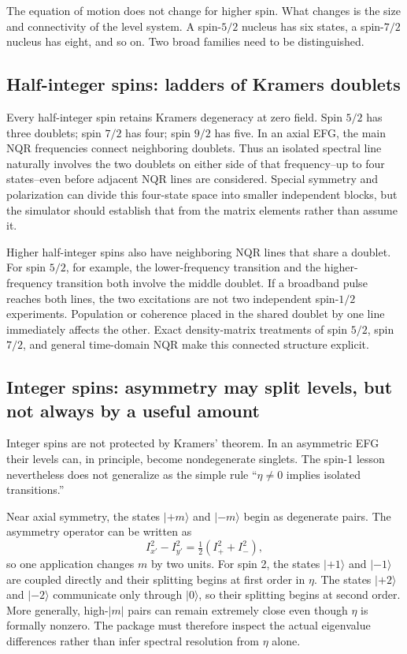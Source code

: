\documentclass[11pt,letterpaper]{article}
\newcommand{\ket}[1]{\lvert #1\rangle}
\begin{document}
The equation of motion does not change for higher spin. What changes is the size and connectivity of the level system. A spin-$5/2$ nucleus has six states, a spin-$7/2$ nucleus has eight, and so on. Two broad families need to be distinguished.

\subsection{Half-integer spins: ladders of Kramers doublets}

Every half-integer spin retains Kramers degeneracy at zero field. Spin $5/2$ has three doublets; spin $7/2$ has four; spin $9/2$ has five. In an axial EFG, the main NQR frequencies connect neighboring doublets. Thus an isolated spectral line naturally involves the two doublets on either side of that frequency--up to four states--even before adjacent NQR lines are considered. Special symmetry and polarization can divide this four-state space into smaller independent blocks, but the simulator should establish that from the matrix elements rather than assume it.

Higher half-integer spins also have neighboring NQR lines that share a doublet. For spin $5/2$, for example, the lower-frequency transition and the higher-frequency transition both involve the middle doublet. If a broadband pulse reaches both lines, the two excitations are not two independent spin-$1/2$ experiments. Population or coherence placed in the shared doublet by one line immediately affects the other. Exact density-matrix treatments of spin $5/2$, spin $7/2$, and general time-domain NQR make this connected structure explicit.\cite{nagel1995,ageev1996,harel2006}

\subsection{Integer spins: asymmetry may split levels, but not always by a useful amount}

Integer spins are not protected by Kramers' theorem. In an asymmetric EFG their levels can, in principle, become nondegenerate singlets. The spin-1 lesson nevertheless does not generalize as the simple rule ``$\eta\neq0$ implies isolated transitions.''

Near axial symmetry, the states $\ket{+m}$ and $\ket{-m}$ begin as degenerate pairs. The asymmetry operator can be written as
\begin{equation}
I_{x'}^2-I_{y'}^2=\tfrac12\left(I_+^2+I_-^2\right),
\label{eq:dm2}
\end{equation}
so one application changes $m$ by two units. For spin 2, the states $\ket{+1}$ and $\ket{-1}$ are coupled directly and their splitting begins at first order in $\eta$. The states $\ket{+2}$ and $\ket{-2}$ communicate only through $\ket0$, so their splitting begins at second order. More generally, high-$|m|$ pairs can remain extremely close even though $\eta$ is formally nonzero. The package must therefore inspect the actual eigenvalue differences rather than infer spectral resolution from $\eta$ alone.
\end{document}
